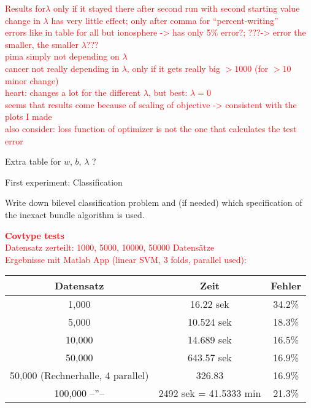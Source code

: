 \textcolor{red}{Results for\(\lambda\) only if it stayed there after second run with second starting value\\
change in \(\lambda\) has very little effect; only after comma for ``percent-writing''\\
errors like in table for all but ionosphere -> has only 5\% error?; ???-> error the smaller, the smaller \(\lambda\)???\\
pima simply not depending on \(\lambda\)\\
cancer not really depending in \(\lambda\), only if it gets really big \(>1000\) (for \(>10\) minor change)\\
heart: changes a lot for the different \(\lambda\), but best: \(\lambda=0\)\\
seems that results come because of scaling of objective -> consistent with the plots I made\\
also consider: loss function of optimizer is not the one that calculates the test error } 


Extra table for \(w\), \(b\), \(\lambda\) ?

First experiment: Classification

Write down bilevel classification problem and (if needed) which specification of the inexact bundle algorithm is used.















\textcolor{red}{\textbf{Covtype tests}\\
Datensatz zerteilt: 1000, 5000, 10000, 50000 Datens\"atze\\
Ergebnisse mit Matlab App (linear SVM, 3 folds, parallel used):\\
\begin{tabular}{c|c|c}
Datensatz & Zeit & Fehler \\
\hline
1,000 & 16.22 sek & 34.2\% \\
5,000 & 10.524 sek & 18.3\% \\
10,000 & 14.689 sek & 16.5\% \\
50,000 &  643.57 sek & 16.9\% \\
50,000 (Rechnerhalle, 4 parallel) & 326.83 & 16.9\% \\
100,000 --''-- & 2492 sek = 41.5333 min & 21.3\%
\end{tabular}}

